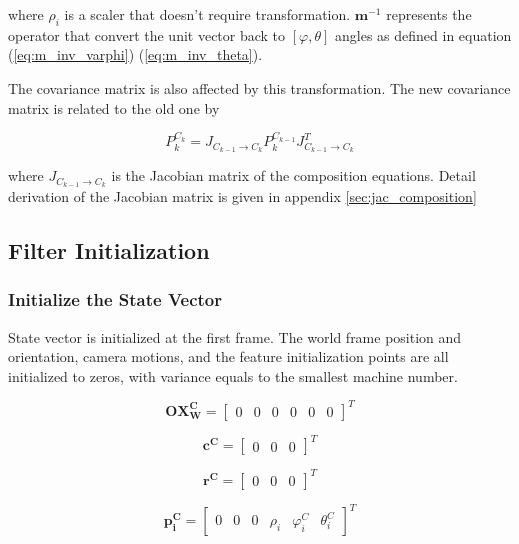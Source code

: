 \noindent where $\rho_i$ is a scaler that doesn't require transformation.
$\mathbf{m}^{-1}$ represents the operator that convert
the unit vector back to $[\varphi, \theta]$ angles as defined in
equation (\ref{eq:m_inv_varphi}) (\ref{eq:m_inv_theta}).

The covariance matrix is also affected by this transformation. The new
covariance matrix is related to the old one by

\begin{equation}
P_{k}^{C_{k}}=J_{C_{k-1}\to C_{k}}P_{k}^{C_{k-1}}J_{C_{k-1}\to C_{k}}^{T}
\end{equation}

\noindent where $J_{C_{k-1} \to C_k}$ is the Jacobian matrix of the
composition equations. Detail derivation of the Jacobian matrix is
given in appendix \ref{sec:jac_composition}  

\subsection{Filter Initialization} \label{sec:filter_initialization}
\subsubsection{Initialize the State Vector}

State vector is initialized at the first frame. The world frame
position and orientation, camera motions, and the feature
initialization points are all initialized to zeros, with variance
equals to the smallest machine number.

\begin{equation}
\label{eq:OX_init}
\mathbf{OX_{W}^{C}}=\begin{bmatrix}0&0&0&0&0&0\end{bmatrix}^T 
\end{equation}

\begin{equation}
\mathbf{c^{C}}=\begin{bmatrix}0&0&0\end{bmatrix}^T
\end{equation}

\begin{equation}
\mathbf{r^{C}}=\begin{bmatrix}0&0&0\end{bmatrix}^T
\end{equation}

\begin{equation}
\mathbf{p_{i}^{C}}=\begin{bmatrix}0&0&0&\rho _{i}&\varphi_{i}^C&\theta_{i}^C\end{bmatrix}^T
\end{equation}

